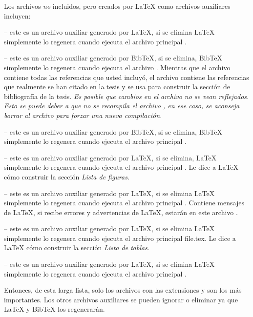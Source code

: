 Los archivos \emph{no} incluidos, pero creados por \LaTeX{} como archivos auxiliares incluyen:

 -- este es un archivo auxiliar generado por \LaTeX{}, si se elimina \LaTeX{} simplemente lo regenera cuando ejecuta el archivo principal .

 -- este es un archivo auxiliar generado por BibTeX, si se elimina, BibTeX simplemente lo regenera cuando ejecuta el archivo . Mientras que el archivo  contiene todas las referencias que usted incluyó, el archivo  contiene las referencias que realmente se han citado en la tesis y se usa para construir la sección de bibliografía de la tesis. \emph{Es posible que cambios en el archivo  no se vean reflejados. Esto se puede deber a que no se recompila el archivo , en ese caso, se aconseja borrar al archivo  para forzar una nueva compilación.}

 -- este es un archivo auxiliar generado por BibTeX, si se elimina, BibTeX simplemente lo regenera cuando ejecuta el archivo principal .

 -- este es un archivo auxiliar generado por \LaTeX{}, si se elimina, \LaTeX{} simplemente lo regenera cuando ejecuta el archivo principal . Le dice a \LaTeX{} cómo construir la sección \emph{Lista de figuras}.

 -- este es un archivo auxiliar generado por \LaTeX{}, si se elimina \LaTeX{} simplemente lo regenera cuando ejecuta el archivo principal . Contiene mensajes de \LaTeX{}, si recibe errores y advertencias de \LaTeX {}, estarán en este archivo .

 -- este es un archivo auxiliar generado por \LaTeX{}, si se elimina \LaTeX{} simplemente lo regenera cuando ejecuta el archivo principal  file{.tex}. Le dice a \LaTeX{} cómo construir la sección \emph{Lista de tablas}.

 -- este es un archivo auxiliar generado por \LaTeX{}, si se elimina \LaTeX{} simplemente lo regenera cuando ejecuta el archivo principal  .

Entonces, de esta larga lista, solo los archivos con las extensiones   y  son los más importantes. Los otros archivos auxiliares se pueden ignorar o eliminar ya que \LaTeX{} y BibTeX los regenerarán.

